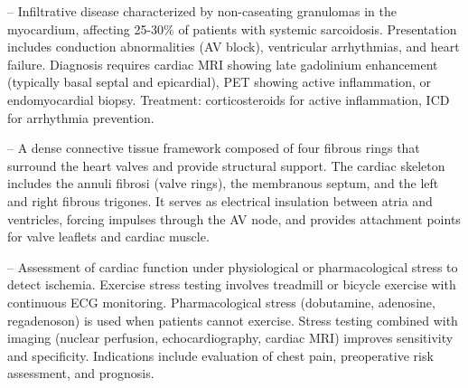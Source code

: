-- Infiltrative disease characterized by non-caseating granulomas in the myocardium, affecting 25-30\% of patients with systemic sarcoidosis. Presentation includes conduction abnormalities (AV block), ventricular arrhythmias, and heart failure. Diagnosis requires cardiac MRI showing late gadolinium enhancement (typically basal septal and epicardial), PET showing active inflammation, or endomyocardial biopsy. Treatment: corticosteroids for active inflammation, ICD for arrhythmia prevention.

-- A dense connective tissue framework composed of four fibrous rings that surround the heart valves and provide structural support. The cardiac skeleton includes the annuli fibrosi (valve rings), the membranous septum, and the left and right fibrous trigones. It serves as electrical insulation between atria and ventricles, forcing impulses through the AV node, and provides attachment points for valve leaflets and cardiac muscle.

-- Assessment of cardiac function under physiological or pharmacological stress to detect ischemia. Exercise stress testing involves treadmill or bicycle exercise with continuous ECG monitoring. Pharmacological stress (dobutamine, adenosine, regadenoson) is used when patients cannot exercise. Stress testing combined with imaging (nuclear perfusion, echocardiography, cardiac MRI) improves sensitivity and specificity. Indications include evaluation of chest pain, preoperative risk assessment, and prognosis.

